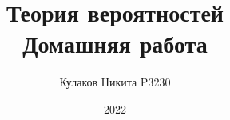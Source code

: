 
\title{Теория вероятностей\\ Домашняя работа}
\date{2022}
\author{Кулаков Никита P3230}



\maketitle

\begin{sloppypar}
\tableofcontents
\newpage


\end{sloppypar}

